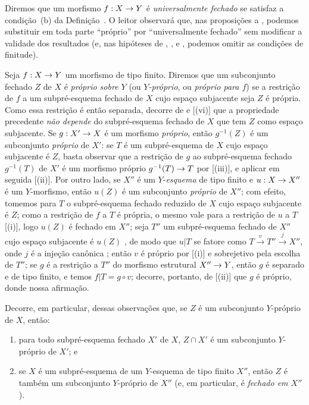 \documentclass[oneside,10pt]{amsart}
\makeatletter
\newcommand{\ega@arrow}[2]{\mathchoice{#1}{#2}{#2}{#2}}
\renewcommand{\to}{\ega@arrow{\longrightarrow}{\rightarrow}}
\newcommand{\oldpage}[2][]{\marginnote{\normalfont\footnotesize\textbf{#1}~|~#2}\ignorespaces}
\let\EGAOriginalLabel\label
\renewcommand{\label}[1]{\phantomsection\EGAOriginalLabel{#1}}
\makeatother
\begin{document}
\begin{remark}[5.4.9]
\label{II.5.4.9}
Diremos que um morfismo $f:X\to Y$ é \emph{universalmente fechado} se satisfaz a condição~(b) da Definição~.
O leitor observará que,
\oldpage[II]{103}
nas proposições  a , podemos substituir em toda parte ``próprio'' por ``universalmente fechado'' sem modificar a validade dos resultados (e, nas hipóteses de , ,  e , podemos omitir as condições de finitude).
\end{remark}

\begin{env}[5.4.10]
\label{II.5.4.10}
Seja $f:X\to Y$ um morfismo de tipo finito.
Diremos que um subconjunto fechado $Z$ de $X$ é \emph{próprio sobre $Y$} (ou \emph{$Y$-próprio}, ou \emph{próprio para $f$}) se a restrição de $f$ a um subpré-esquema fechado de $X$ cujo espaço subjacente seja $Z$  é própria.
Como essa restrição é então separada, decorre de  e [(vi)] que a propriedade precedente \emph{não depende} do subpré-esquema fechado de $X$ que tem $Z$ como espaço subjacente.
Se $g:X'\to X$ é um morfismo \emph{próprio}, então $g^{-1}(Z)$ é um subconjunto \emph{próprio} de $X'$:
se $T$ é um subpré-esquema de $X$ cujo espaço subjacente é $Z$, basta observar que a restrição de $g$ ao subpré-esquema fechado $g^{-1}(T)$ de $X'$ é um morfismo próprio $g^{-1}(T)\to T$ por [(iii)], e aplicar em seguida [(ii)].
Por outro lado, se $X''$ é um $Y$-\emph{esquema} de tipo finito e $u:X\to X''$ é um $Y$-morfismo, então $u(Z)$ é um subconjunto \emph{próprio} de $X''$;
com efeito, tomemos para $T$ o subpré-esquema fechado reduzido de $X$ cujo espaço subjacente é $Z$;
como a restrição de $f$ a $T$ é própria, o mesmo vale para a restrição de $u$ a $T$ [(i)], logo $u(Z)$ é fechado em $X''$;
seja $T''$ um subpré-esquema fechado de $X''$ cujo espaço subjacente é $u(Z)$ , de modo que $u|T$ se fatore como $T\xrightarrow{v}T''\xrightarrow{j}X''$, onde $j$ é a injeção canônica ; então $v$ é próprio por [(i)] e sobrejetivo pela escolha de $T''$;
se $g$ é a restrição a $T''$ do morfismo estrutural $X''\to Y$, então $g$ é separado e de tipo finito, e temos $f|T=g\circ v$;
decorre, portanto, de [(ii)] que $g$ é próprio, donde nossa afirmação.
\end{env}

Decorre, em particular, dessas observações que, se $Z$ é um subconjunto $Y$-próprio de $X$, então:
\begin{enumerate}
  \item para todo subpré-esquema fechado $X'$ de $X$, $Z\cap X'$ é um subconjunto $Y$-próprio de $X'$; e
  \item se $X$ é um subpré-esquema de um $Y$-esquema de tipo finito $X''$, então $Z$ é também um subconjunto $Y$-próprio de $X''$ (e, em particular, é \emph{fechado em $X''$}).
\end{enumerate}
\end{document}
